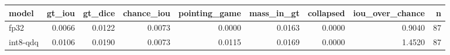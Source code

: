 \begin{tabular}{lrrrrrrrr}
\toprule
model & gt\_iou & gt\_dice & chance\_iou & pointing\_game & mass\_in\_gt & collapsed & iou\_over\_chance & n \\
\midrule
fp32 & 0.0066 & 0.0122 & 0.0073 & 0.0000 & 0.0163 & 0.0000 & 0.9040 & 87 \\
int8-qdq & 0.0106 & 0.0190 & 0.0073 & 0.0115 & 0.0169 & 0.0000 & 1.4520 & 87 \\
\bottomrule
\end{tabular}
